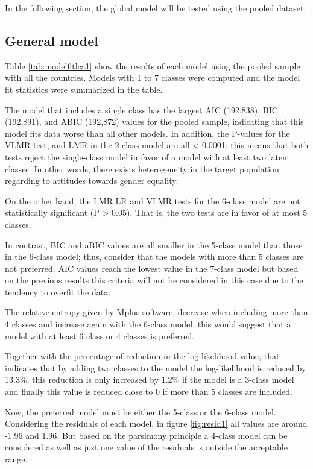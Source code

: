 \documentclass[12pt,a4paper,oneside]{reedthesis}
\begin{document}
In the following section, the global model will be tested using the pooled dataset.

\hypertarget{general-model}{%
\subsection{General model}\label{general-model}}

Table \ref{tab:modelfitlca1} show the results of each model using the pooled sample with all the countries. Models with 1 to 7 classes were computed and the model fit statistics were summarized in the table.

The model that includes a single class has the largest AIC (192,838), BIC (192,891), and ABIC (192,872) values for the pooled sample, indicating that this model fits data worse than all other models. In addition, the P-values for the VLMR test, and LMR in the 2-class model are all \textless{} 0.0001; this means that both tests reject the single-class model in favor of a model with at least two latent classes. In other words, there exists heterogeneity in the target population regarding to attitudes towards gender equality.

On the other hand, the LMR LR and VLMR tests for the 6-class model are not statistically significant (P \textgreater{} 0.05). That is, the two tests are in favor of at most 5 classes.

In contrast, BIC and aBIC values are all smaller in the 5-class model than those in the 6-class model; thus, consider that the models with more than 5 classes are not preferred. AIC values reach the lowest value in the 7-class model but based on the previous results this criteria will not be considered in this case due to the tendency to overfit the data.

The relative entropy given by Mplus software, decrease when including more than 4 classes and increase again with the 6-class model, this would suggest that a model with at least 6 class or 4 classes is preferred.

Together with the percentage of reduction in the log-likelihood value, that indicates that by adding two classes to the model the log-likelihood is reduced by 13.3\%, this reduction is only increased by 1.2\% if the model is a 3-class model and finally this value is reduced close to 0 if more than 5 classes are included.

Now, the preferred model must be either the 5-class or the 6-class model. Considering the residuals of each model, in figure \ref{fig:resid1} all values are around -1.96 and 1.96. But based on the parsimony principle a 4-class model can be considered as well as just one value of the residuals is outside the acceptable range.
\end{document}
